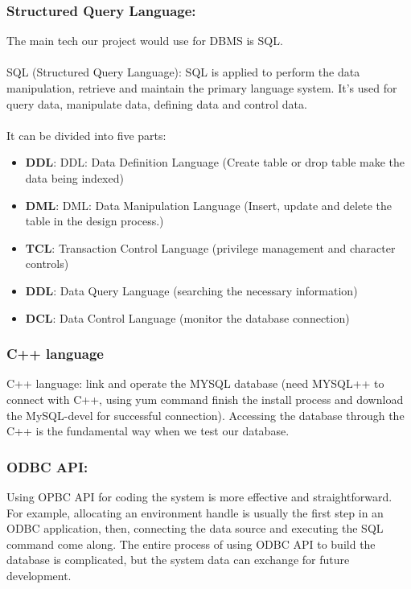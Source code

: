 \documentclass[onecolumn, draftclsnofoot,10pt, compsoc]{IEEEtran}
\begin{document}
\subsubsection{Structured Query Language:}
 The main tech our project would use for DBMS is SQL. \\
\\
    \indent SQL (Structured Query Language): SQL is applied to perform the data manipulation, retrieve and maintain the primary language system. It’s used for query data, manipulate data, defining data and control data. \\
\\
    \indent It can be divided into five parts:
     \begin{itemize}
      \item \textbf{DDL}: DDL: Data Definition Language (Create table or drop table make the data being indexed)
      \item \textbf{DML}: DML: Data Manipulation Language (Insert, update and delete the table in the design process.) 
      \item \textbf{TCL}: Transaction Control Language (privilege management and character controls)
      \item \textbf{DDL}: Data Query Language (searching the necessary information)
      \item \textbf{DCL}: Data Control Language (monitor the database connection)
         \end{itemize}

\subsubsection{C++ language }  
C++ language: link and operate the MYSQL database (need MYSQL++ to connect with C++, using yum command finish the install process and download the MySQL-devel for successful connection). Accessing the database through the C++ is the fundamental way when we test our database.

\subsubsection{ODBC API:  }
Using OPBC API for coding the system is more effective and straightforward. For example, allocating an environment handle is usually the first step in an ODBC application, then, connecting the data source and executing the SQL command come along. The entire process of using ODBC API to build the database is complicated, but the system data can exchange for future development.
\end{document}
